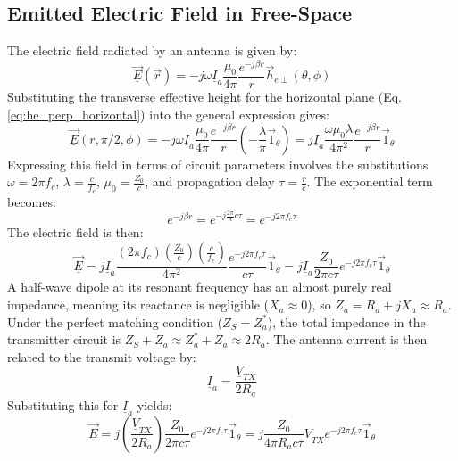 \subsection{Emitted Electric Field in Free-Space}
The electric field radiated by an antenna is given by:
\begin{equation}
    \underline{\vec{E}}(\vec{r}) = -j\omega \underline{I}_a \frac{\mu_0}{4\pi} \frac{e^{-j\beta r}}{r} \vec{h}_{e\perp}(\theta, \phi)
\end{equation}
\vspace{0.5em}
Substituting the transverse effective height for the horizontal plane (Eq. \ref{eq:he_perp_horizontal}) into the general expression gives:
\begin{equation}
    \underline{\vec{E}}(r, \pi/2, \phi) = -j\omega \underline{I}_a \frac{\mu_0}{4\pi} \frac{e^{-j\beta r}}{r} \left(-\frac{\lambda}{\pi} \vec{1}_\theta\right) = j \underline{I}_a \frac{\omega \mu_0 \lambda}{4\pi^2} \frac{e^{-j\beta r}}{r} \vec{1}_\theta
\end{equation}
\vspace{0.5em}
Expressing this field in terms of circuit parameters involves the substitutions $\omega = 2\pi f_c$, $\lambda = \frac{c}{f_c}$, $\mu_0 = \frac{Z_0}{c}$, and propagation delay $\tau = \frac{r}{c}$. The exponential term becomes:
\begin{equation}
    e^{-j\beta r} = e^{-j\frac{2\pi}{\lambda}c\tau} = e^{-j2\pi f_c \tau}
\end{equation}
\vspace{0.5em}
The electric field is then:
\begin{equation}
    \underline{\vec{E}} = j \underline{I}_a \frac{(2\pi f_c) (\frac{Z_0}{c}) (\frac{c}{f_c})}{4\pi^2} \frac{e^{-j2\pi f_c \tau}}{c\tau} \vec{1}_\theta = j \underline{I}_a \frac{Z_0}{2\pi c\tau} e^{-j2\pi f_c \tau} \vec{1}_\theta
\end{equation}
\vspace{0.5em}
A half-wave dipole at its resonant frequency has an almost purely real impedance, meaning its reactance is negligible ($X_a \approx 0$), so $Z_a = R_a + jX_a \approx R_a$. Under the perfect matching condition ($Z_S = Z_a^*$), the total impedance in the transmitter circuit is $Z_S + Z_a \approx Z_a^* + Z_a \approx 2R_a$. The antenna current is then related to the transmit voltage by:
\begin{equation}
    \underline{I}_a = \frac{\underline{V}_{TX}}{2R_a}
\end{equation}
\vspace{0.5em}
Substituting this for $\underline{I}_a$ yields:
\begin{equation}
    \underline{\vec{E}} = j \left(\frac{\underline{V}_{TX}}{2R_a}\right) \frac{Z_0}{2\pi c\tau} e^{-j2\pi f_c \tau} \vec{1}_\theta = j \frac{Z_0}{4\pi R_a c\tau} \underline{V}_{TX} e^{-j2\pi f_c \tau} \vec{1}_\theta
    \label{eq:E_field_final}
\end{equation}

